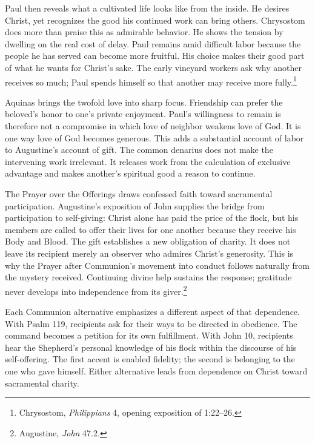Paul then reveals what a cultivated life looks like from the inside. He desires Christ, yet recognizes the good his continued work can bring others. Chrysostom does more than praise this as admirable behavior. He shows the tension by dwelling on the real cost of delay. Paul remains amid difficult labor because the people he has served can become more fruitful. His choice makes their good part of what he wants for Christ's sake. The early vineyard workers ask why another receives so much; Paul spends himself so that another may receive more fully.\footnote{Chrysostom, \textit{Philippians} 4, opening exposition of 1:22--26.}

Aquinas brings the twofold love into sharp focus. Friendship can prefer the beloved's honor to one's private enjoyment. Paul's willingness to remain is therefore not a compromise in which love of neighbor weakens love of God. It is one way love of God becomes generous. This adds a substantial account of labor to Augustine's account of gift. The common denarius does not make the intervening work irrelevant. It releases work from the calculation of exclusive advantage and makes another's spiritual good a reason to continue.

The Prayer over the Offerings draws confessed faith toward sacramental participation. Augustine's exposition of John supplies the bridge from participation to self-giving: Christ alone has paid the price of the flock, but his members are called to offer their lives for one another because they receive his Body and Blood. The gift establishes a new obligation of charity. It does not leave its recipient merely an observer who admires Christ's generosity. This is why the Prayer after Communion's movement into conduct follows naturally from the mystery received. Continuing divine help sustains the response; gratitude never develops into independence from its giver.\footnote{Augustine, \textit{John} 47.2.}

Each Communion alternative emphasizes a different aspect of that dependence. With Psalm 119, recipients ask for their ways to be directed in obedience. The command becomes a petition for its own fulfillment. With John 10, recipients hear the Shepherd's personal knowledge of his flock within the discourse of his self-offering. The first accent is enabled fidelity; the second is belonging to the one who gave himself. Either alternative leads from dependence on Christ toward sacramental charity.

